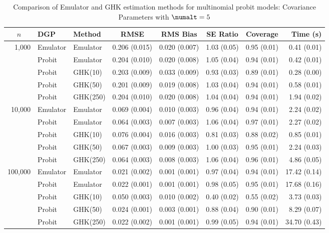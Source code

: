 \begin{table}[htbp]
\centering
\footnotesize
\begin{tabular}{@{}rllrrrrr@{}}
\toprule
\multicolumn{1}{c}{$n$} & \multicolumn{1}{l}{DGP} & \multicolumn{1}{l}{Method} & \multicolumn{1}{c}{RMSE} & \multicolumn{1}{c}{RMS Bias} & \multicolumn{1}{c}{SE Ratio} & \multicolumn{1}{c}{Coverage} & \multicolumn{1}{r}{Time (s)} \\
\midrule
\multirow{5}{*}{1,000} & Emulator & Emulator & 0.206 (0.015) & 0.020 (0.007) & 1.03 (0.05) & 0.95 (0.01) & 0.41 (0.01) \\
 & Probit & Emulator & 0.204 (0.010) & 0.020 (0.008) & 1.05 (0.04) & 0.94 (0.01) & 0.42 (0.01) \\
 & Probit & GHK(10) & 0.203 (0.009) & 0.033 (0.009) & 0.93 (0.03) & 0.89 (0.01) & 0.28 (0.00) \\
 & Probit & GHK(50) & 0.201 (0.009) & 0.019 (0.008) & 1.03 (0.04) & 0.94 (0.01) & 0.58 (0.01) \\
 & Probit & GHK(250) & 0.204 (0.010) & 0.020 (0.008) & 1.04 (0.04) & 0.94 (0.01) & 1.94 (0.02) \\
\midrule
\multirow{5}{*}{10,000} & Emulator & Emulator & 0.069 (0.004) & 0.010 (0.003) & 0.96 (0.04) & 0.94 (0.01) & 2.24 (0.02) \\
 & Probit & Emulator & 0.064 (0.003) & 0.007 (0.003) & 1.06 (0.04) & 0.97 (0.01) & 2.27 (0.02) \\
 & Probit & GHK(10) & 0.076 (0.004) & 0.016 (0.003) & 0.81 (0.03) & 0.88 (0.02) & 0.85 (0.01) \\
 & Probit & GHK(50) & 0.067 (0.003) & 0.009 (0.003) & 1.00 (0.03) & 0.95 (0.01) & 2.24 (0.03) \\
 & Probit & GHK(250) & 0.064 (0.003) & 0.008 (0.003) & 1.06 (0.04) & 0.96 (0.01) & 4.86 (0.05) \\
\midrule
\multirow{5}{*}{100,000} & Emulator & Emulator & 0.021 (0.002) & 0.001 (0.001) & 0.97 (0.04) & 0.94 (0.01) & 17.42 (0.14) \\
 & Probit & Emulator & 0.022 (0.001) & 0.001 (0.001) & 0.98 (0.05) & 0.95 (0.01) & 17.68 (0.16) \\
 & Probit & GHK(10) & 0.050 (0.003) & 0.010 (0.002) & 0.40 (0.02) & 0.55 (0.02) & 3.73 (0.03) \\
 & Probit & GHK(50) & 0.024 (0.001) & 0.003 (0.001) & 0.88 (0.04) & 0.90 (0.01) & 8.29 (0.07) \\
 & Probit & GHK(250) & 0.022 (0.002) & 0.001 (0.001) & 0.99 (0.05) & 0.94 (0.01) & 34.70 (0.43) \\
\bottomrule
\end{tabular}
\caption{Comparison of Emulator and GHK estimation methods for multinomial probit models: Covariance Parameters with $\numalt=5$}
\label{tab:emulator_vs_ghk:5:covariance}
\end{table}
